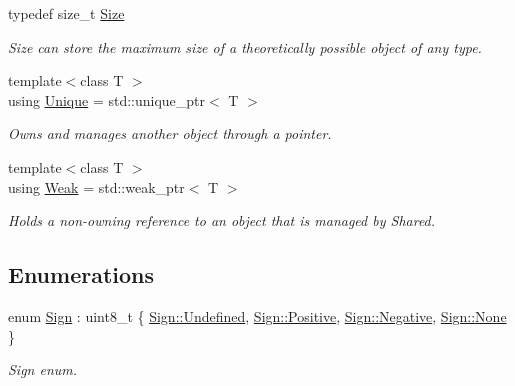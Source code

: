 \begin{DoxyCompactItemize}
typedef size\+\_\+t \hyperlink{namespacelibrary_1_1core_1_1types_a701626ea1027888ebbb8cfd0ff7adab0}{Size}
\begin{DoxyCompactList}\small\item\em Size can store the maximum size of a theoretically possible object of any type. \end{DoxyCompactList}\item 
{\footnotesize template$<$class T $>$ }\\using \hyperlink{namespacelibrary_1_1core_1_1types_ac12d38691838fbc9a36765ee62ace52a}{Unique} = std\+::unique\+\_\+ptr$<$ T $>$
\begin{DoxyCompactList}\small\item\em Owns and manages another object through a pointer. \end{DoxyCompactList}\item 
{\footnotesize template$<$class T $>$ }\\using \hyperlink{namespacelibrary_1_1core_1_1types_a26c13c272f9fba4ce17ee4980be6703c}{Weak} = std\+::weak\+\_\+ptr$<$ T $>$
\begin{DoxyCompactList}\small\item\em Holds a non-\/owning reference to an object that is managed by Shared. \end{DoxyCompactList}\end{DoxyCompactItemize}
\subsection*{Enumerations}
\begin{DoxyCompactItemize}
\item 
enum \hyperlink{namespacelibrary_1_1core_1_1types_a06d9eaa410d43a0fa3f383040618e87d}{Sign} \+: uint8\+\_\+t \{ \hyperlink{namespacelibrary_1_1core_1_1types_a06d9eaa410d43a0fa3f383040618e87daec0fc0100c4fc1ce4eea230c3dc10360}{Sign\+::\+Undefined}, 
\hyperlink{namespacelibrary_1_1core_1_1types_a06d9eaa410d43a0fa3f383040618e87da3289297424e01eda5b788c083bbf3147}{Sign\+::\+Positive}, 
\hyperlink{namespacelibrary_1_1core_1_1types_a06d9eaa410d43a0fa3f383040618e87daffb9356ff2b7da85c75c92fa7ea03b8b}{Sign\+::\+Negative}, 
\hyperlink{namespacelibrary_1_1core_1_1types_a06d9eaa410d43a0fa3f383040618e87da6adf97f83acf6453d4a6a4b1070f3754}{Sign\+::\+None}
 \}\begin{DoxyCompactList}\small\item\em Sign enum. \end{DoxyCompactList}
\end{DoxyCompactItemize}
